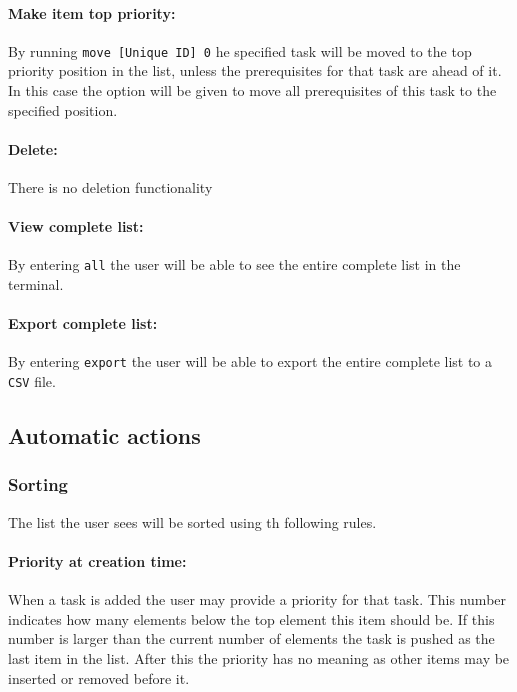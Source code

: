 \documentclass[12pt]{article}
\newcommand{\e}[1] {{\tt #1}}
\begin{document}
\paragraph{Make item top priority:} \label{sec:Make top} By running \e{move [Unique ID] 0} he specified task will be moved to the top priority position in the list, unless the prerequisites for that task are ahead of it. In this case the option will be given to move all prerequisites of this task to the specified position.
\paragraph{Delete:} \label{sec:Delete} There is no deletion functionality
\paragraph{View complete list:} \label{sec:View complete list} By entering \e{all} the user will be able to see the entire complete list in the terminal.
\paragraph{Export complete list:} \label{sec:Export complete list} By entering \e{export} the user will be able to export the entire complete list to a \e{CSV} file.
\subsection{Automatic actions}
\subsubsection{Sorting} \label{sec:Sorting}
The list the user sees will be sorted using th following rules.
\paragraph{Priority at creation time:} \label{sec:Sorting - Priority} When a task is added the user may provide a priority for that task. This number indicates how many elements below the top element this item should be. If this number is larger than the current number of elements the task is pushed as the last item in the list. After this the priority has no meaning as other items may be inserted or removed before it.
\end{document}
